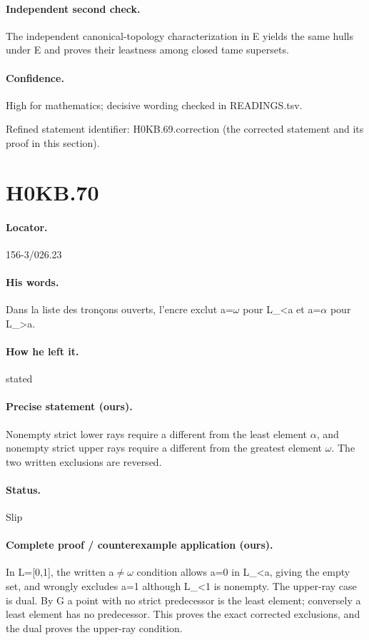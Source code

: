 \paragraph{Independent second check.} The independent canonical-topology characterization in E yields the same hulls under E and proves their leastness among closed tame supersets.

\paragraph{Confidence.} High for mathematics; decisive wording checked in READINGS.tsv.

\noindent Refined statement identifier: H0KB.69.correction (the corrected statement and its proof in this section).

\section*{H0KB.70}\label{statement:H0KB.70}
\paragraph{Locator.} 156-3/026.23

\paragraph{His words.} Dans la liste des tronçons ouverts, l’encre exclut a=\ensuremath{\omega} pour L\_<a et a=\ensuremath{\alpha} pour L\_>a.

\paragraph{How he left it.} stated

\paragraph{Precise statement (ours).} Nonempty strict lower rays require a different from the least element \ensuremath{\alpha}, and nonempty strict upper rays require a different from the greatest element \ensuremath{\omega}. The two written exclusions are reversed.

\paragraph{Status.} Slip

\paragraph{Complete proof / counterexample application (ours).} In L=[0,1], the written a\ensuremath{\ne}\ensuremath{\omega} condition allows a=0 in L\_<a, giving the empty set, and wrongly excludes a=1 although L\_<1 is nonempty. The upper-ray case is dual. By G a point with no strict predecessor is the least element; conversely a least element has no predecessor. This proves the exact corrected exclusions, and the dual proves the upper-ray condition.

